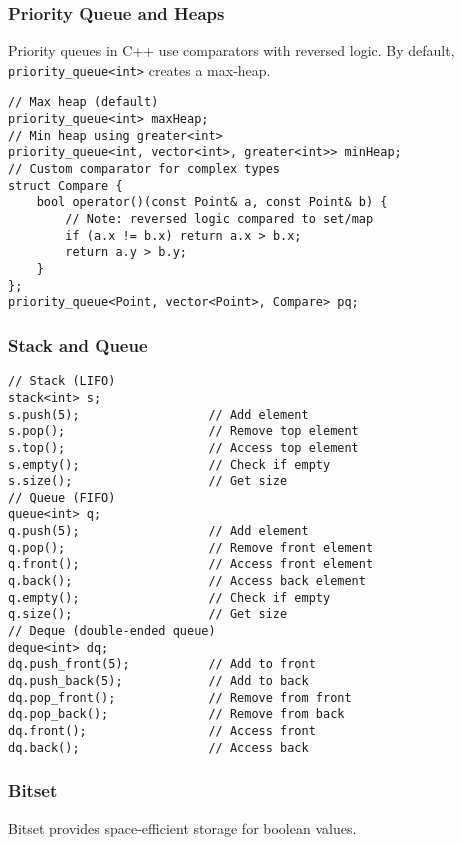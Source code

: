 \documentclass[11pt,a4paper]{article}
\begin{document}
\subsubsection{Priority Queue and Heaps}
Priority queues in C++ use comparators with reversed logic. By default, \texttt{priority\_queue<int>} creates a max-heap.

\begin{lstlisting}[caption={Basic Priority Queue}]
// Max heap (default)
priority_queue<int> maxHeap;
// Min heap using greater<int>
priority_queue<int, vector<int>, greater<int>> minHeap;
// Custom comparator for complex types
struct Compare {
    bool operator()(const Point& a, const Point& b) {
        // Note: reversed logic compared to set/map
        if (a.x != b.x) return a.x > b.x;
        return a.y > b.y;
    }
};
priority_queue<Point, vector<Point>, Compare> pq;
\end{lstlisting}



\subsubsection{Stack and Queue}
\begin{lstlisting}[caption={Stack and Queue Operations}]
// Stack (LIFO)
stack<int> s;
s.push(5);                  // Add element
s.pop();                    // Remove top element
s.top();                    // Access top element
s.empty();                  // Check if empty
s.size();                   // Get size
// Queue (FIFO)
queue<int> q;
q.push(5);                  // Add element
q.pop();                    // Remove front element
q.front();                  // Access front element
q.back();                   // Access back element
q.empty();                  // Check if empty
q.size();                   // Get size
// Deque (double-ended queue)
deque<int> dq;
dq.push_front(5);           // Add to front
dq.push_back(5);            // Add to back
dq.pop_front();             // Remove from front
dq.pop_back();              // Remove from back
dq.front();                 // Access front
dq.back();                  // Access back
\end{lstlisting}

\newpage

\subsubsection{Bitset}
Bitset provides space-efficient storage for boolean values.
\end{document}
